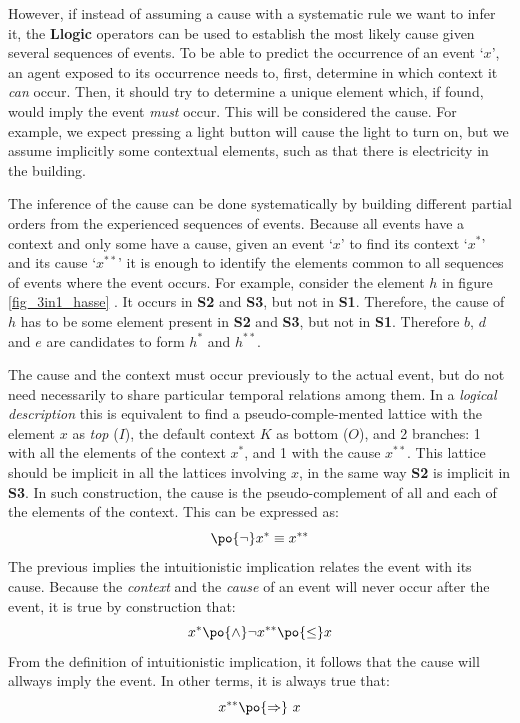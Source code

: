 \documentclass[
		twoside,openright,titlepage,numbers=noenddot,manychapters,
		headinclude,%
                footinclude=false,cleardoublepage=empty,
                BCOR=5mm,
		fontsize=11pt, %
                 enabledeprecatedfontcommands]{scrreprt}
\begin{document}
However, if instead of assuming a cause with a systematic rule we want to infer it, the \textbf{Llogic} operators can be used to establish the most likely cause given several sequences of events. 
To be able to predict the occurrence of an event `$x$', an agent exposed to its occurrence needs to, first, determine in which context it \emph{can} occur. Then, it should try to determine a unique element which, if found, would imply the event \emph{must} occur. This will be considered the cause. For example, we expect pressing a light button will cause the light to turn on, but we assume implicitly some contextual elements, such as that there is electricity in the building.


The inference of the cause can be done systematically by building different partial orders from the experienced sequences of events. Because all events have a context and only some have a cause, given an event `$x$' to find its context `$x^*$' and its cause `$x^{**}$'  it is enough to identify the elements common to all sequences of events where the event occurs. For example,  consider the element $h$ in figure \ref{fig_3in1_hasse} . It occurs in \textbf{S2} and \textbf{S3}, but not in \textbf{S1}. Therefore, the cause of $h$ has to be some element present in \textbf{S2} and \textbf{S3}, but not in \textbf{S1}. Therefore $b$, $d$ and $e$ are candidates to form $h^*$ and $h^{**}$.%

The cause and the context must occur previously to the actual event, but do not need necessarily to share particular temporal relations among them. In a \emph{logical description} this is equivalent to find a pseudo-comple-mented lattice with the element $x$ as \emph{top} ($I$), the default context $K$ as bottom ($O$), and 2 branches: 1 with all the elements of the context $x^*$, and 1 with the cause $x^{**}$.  This lattice should be implicit in all the lattices involving $x$, in the same way \textbf{S2} is implicit in \textbf{S3}. In such construction, the cause is the pseudo-complement of all and each of the elements of the context. This can be expressed as: 
\begin{equation*}
 \po{ \neg } x^* \equiv x^{**} 
\end{equation*}
The previous implies the intuitionistic implication relates the event with its cause. Because the \emph{context} and the \emph{cause} of an event will never occur after the event, it is true by construction that:
\begin{equation*}
  x^* \po{\wedge} \neg x^{**}  \po{ \leq} x  
\end{equation*}
From the definition of intuitionistic implication, it follows that the cause will allways imply the event. In other terms, it is always true that:
\begin{equation*}
 x^{**} \po{\Rightarrow} \ x  
\end{equation*}
\end{document}
